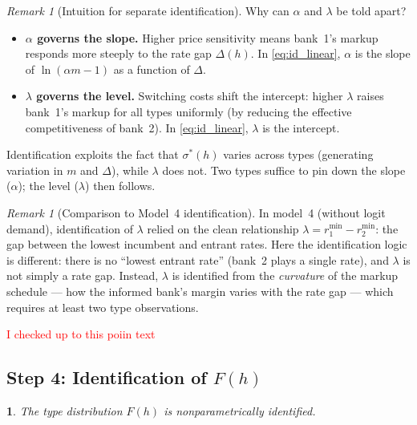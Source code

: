 \documentclass[12pt]{article}
\theoremstyle{plain}
\theoremstyle{plain}
\newtheorem{prop}[thm]{\protect\propositionname}
\theoremstyle{definition}  %
\theoremstyle{remark}  %
\newtheorem{remark}[thm]{Remark}  %
\providecommand{\propositionname}{Proposition}
\begin{document}
\begin{remark}[Intuition for separate identification]\label{rem:intuition_id}
Why can $\alpha$ and $\lambda$ be told apart? 
\begin{itemize}
    \item \textbf{$\alpha$ governs the slope.} Higher price sensitivity means bank~1's markup responds more steeply to the rate gap $\Delta(h)$. In \eqref{eq:id_linear}, $\alpha$ is the slope of $\ln(\alpha m - 1)$ as a function of $\Delta$.
    \item \textbf{$\lambda$ governs the level.} Switching costs shift the intercept: higher $\lambda$ raises bank~1's markup for all types uniformly (by reducing the effective competitiveness of bank~2). In \eqref{eq:id_linear}, $\lambda$ is the intercept.
\end{itemize}
Identification exploits the fact that $\sigma^*(h)$ varies across types (generating variation in $m$ and $\Delta$), while $\lambda$ does not. Two types suffice to pin down the slope ($\alpha$); the level ($\lambda$) then follows.
\end{remark}

\begin{remark}[Comparison to Model~4 identification]
In model~4 (without logit demand), identification of $\lambda$ relied on the clean relationship $\lambda = r_1^{\min} - r_2^{\min}$: the gap between the lowest incumbent and entrant rates. Here the identification logic is different: there is no ``lowest entrant rate'' (bank~2 plays a single rate), and $\lambda$ is not simply a rate gap. Instead, $\lambda$ is identified from the \emph{curvature} of the markup schedule --- how the informed bank's margin varies with the rate gap --- which requires at least two type observations.
\end{remark}

\textcolor{red}{I checked up to this poiin text}

\newpage

\subsection{Step 4: Identification of $F(h)$}

\begin{prop}\label{prop:F}
The type distribution $F(h)$ is nonparametrically identified.
\end{prop}
\end{document}
